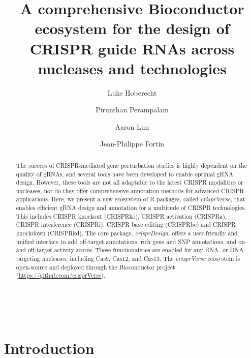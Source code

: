 \documentclass[pdftex,english,10pt]{article}
\begin{document}
\renewcommand\Affilfont{\small}


\title{A comprehensive Bioconductor ecosystem for the design of CRISPR guide RNAs across nucleases and technologies}
\author[1]{Luke Hoberecht}
\author[2]{Pirunthan Perampalam}
\author[1]{Aaron Lun}
\author[1,*]{Jean-Philippe Fortin}
\date{}






\maketitle
\
\begin{abstract}
\noindent 
The success of CRISPR-mediated gene perturbation studies is highly dependent on the quality of gRNAs, and several tools have been developed to enable optimal gRNA design. 
However, these tools are not all adaptable to the latest CRISPR modalities or nucleases, nor do they offer comprehensive annotation methods for advanced CRISPR applications.
Here, we present a new ecosystem of R packages, called \textit{crisprVerse}, that enables efficient gRNA design and annotation for a multitude of CRISPR technologies. This includes CRISPR knockout (CRISPRko), CRISPR activation (CRISPRa), CRISPR interference (CRISPRi), CRISPR base editing (CRISPRbe) and CRISPR knockdown (CRISPRkd). 
The core package, \textit{crisprDesign}, offers a user-friendly and unified interface to add off-target annotations, rich gene and SNP annotations, and on- and off-target activity scores. These functionalities are enabled for any RNA- or DNA-targeting nucleases, including Cas9, Cas12, and Cas13. 
The \textit{crisprVerse} ecosystem is open-source and deployed through the Bioconductor project (\url{https://github.com/crisprVerse}).
 \end{abstract}




\section*{Introduction}
\end{document}
